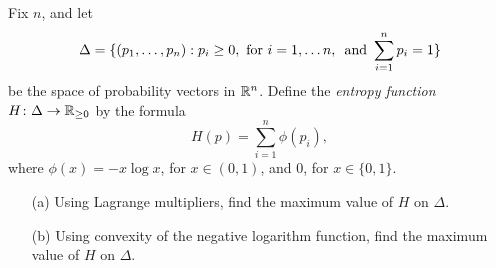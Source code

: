 \documentclass[a4paper, 12pt]{article}
\begin{document}
\begin{problem} 
Fix $n$, and let \[\Delta = \{(p_1,\ldots, p_n) : p_i\geq 0, \hbox{ for } i=1,\ldots n,\,\hbox{ and } \sum_{i=1}^n p_i = 1 \}\] be the space of probability vectors in $\mathbb{R}^n$. Define the {\em entropy function} $H\colon \Delta \to \mathbb{R}_{\geq 0}$ by the formula
\[H(p) = \sum_{i=1}^n \phi(p_i),
\]
where $\phi(x) = -x\log x$, for $x\in (0,1)$, and $0$, for $x\in\{0,1\}$.
\begin{enumerate}
    \item[(a)] Using Lagrange multipliers, find the maximum value of $H$ on $\Delta$.
    \item[(b)] Using convexity of the   negative logarithm function, find the maximum value of $H$ on $\Delta$.
\end{enumerate}
\end{problem}
\end{document}
